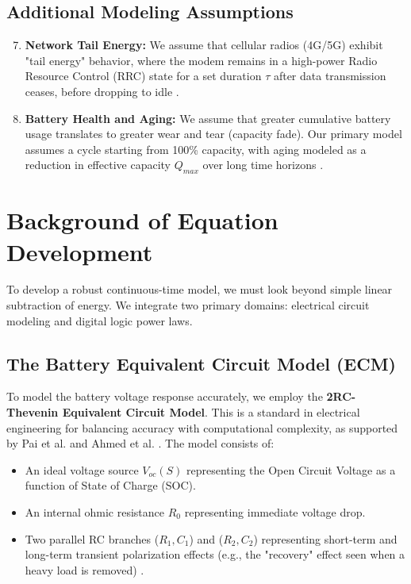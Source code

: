 \documentclass[12pt]{article}
\begin{document}
\subsection{Additional Modeling Assumptions}

\begin{enumerate}
    \setcounter{enumi}{6}
    \item \textbf{Network Tail Energy:} We assume that cellular radios (4G/5G) exhibit "tail energy" behavior, where the modem remains in a high-power Radio Resource Control (RRC) state for a set duration $\tau$ after data transmission ceases, before dropping to idle \cite{13}.
    
    \item \textbf{Battery Health and Aging:} We assume that greater cumulative battery usage translates to greater wear and tear (capacity fade). Our primary model assumes a cycle starting from 100\% capacity, with aging modeled as a reduction in effective capacity $Q_{max}$ over long time horizons \cite{8}.
\end{enumerate}

\section{Background of Equation Development}

To develop a robust continuous-time model, we must look beyond simple linear subtraction of energy. We integrate two primary domains: electrical circuit modeling and digital logic power laws.

\subsection{The Battery Equivalent Circuit Model (ECM)}

To model the battery voltage response accurately, we employ the \textbf{2RC-Thevenin Equivalent Circuit Model}. This is a standard in electrical engineering for balancing accuracy with computational complexity, as supported by Pai et al. \cite{6} and Ahmed et al. \cite{9}. The model consists of:
\begin{itemize}
    \item An ideal voltage source $V_{oc}(S)$ representing the Open Circuit Voltage as a function of State of Charge (SOC).
    \item An internal ohmic resistance $R_0$ representing immediate voltage drop.
    \item Two parallel RC branches ($R_1, C_1$) and ($R_2, C_2$) representing short-term and long-term transient polarization effects (e.g., the "recovery" effect seen when a heavy load is removed) \cite{7}.
\end{itemize}
\end{document}
